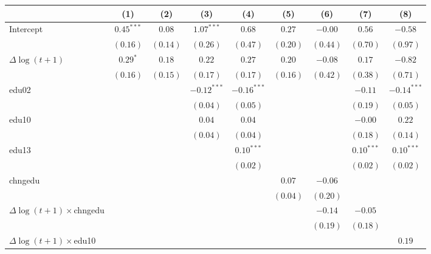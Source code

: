 
\begin{tabular}{l c c c c c c c c }
\hline
 & (1) & (2) & (3) & (4) & (5) & (6) & (7) & (8) \\
\hline
Intercept     & $0.45^{***}$ & $0.08$   & $1.07^{***}$  & $0.68$        & $0.27$   & $-0.00$  & $0.56$       & $-0.58$       \\
                & $(0.16)$     & $(0.14)$ & $(0.26)$      & $(0.47)$      & $(0.20)$ & $(0.44)$ & $(0.70)$     & $(0.97)$      \\
$\Delta \log(t+1)$         & $0.29^{*}$   & $0.18$   & $0.22$        & $0.27$        & $0.20$   & $-0.08$  & $0.17$       & $-0.82$       \\
                & $(0.16)$     & $(0.15)$ & $(0.17)$      & $(0.17)$      & $(0.16)$ & $(0.42)$ & $(0.38)$     & $(0.71)$      \\
edu02           &              &          & $-0.12^{***}$ & $-0.16^{***}$ &          &          & $-0.11$      & $-0.14^{***}$ \\
                &              &          & $(0.04)$      & $(0.05)$      &          &          & $(0.19)$     & $(0.05)$      \\
edu10           &              &          & $0.04$        & $0.04$        &          &          & $-0.00$      & $0.22$        \\
                &              &          & $(0.04)$      & $(0.04)$      &          &          & $(0.18)$     & $(0.14)$      \\
edu13           &              &          &               & $0.10^{***}$  &          &          & $0.10^{***}$ & $0.10^{***}$  \\
                &              &          &               & $(0.02)$      &          &          & $(0.02)$     & $(0.02)$      \\
chngedu         &              &          &               &               & $0.07$   & $-0.06$  &              &               \\
                &              &          &               &               & $(0.04)$ & $(0.20)$ &              &               \\
$\Delta \log(t+1) \times$chngedu &              &          &               &               &          & $-0.14$  & $-0.05$      &               \\
                &              &          &               &               &          & $(0.19)$ & $(0.18)$     &               \\
$\Delta \log(t+1) \times$edu10   &              &          &               &               &          &          &              & $0.19$        \\

\end{tabular}

